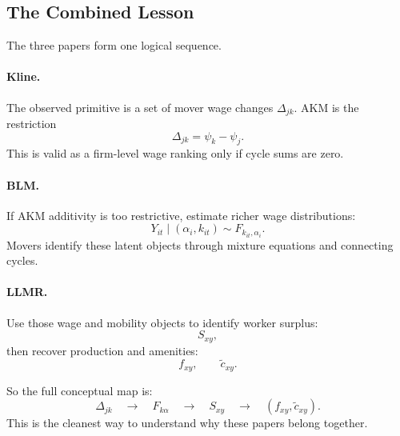 \documentclass[11pt]{article}
\newcommand{\1}{\mathbf{1}}
\begin{document}
\subsection{The Combined Lesson}

The three papers form one logical sequence.

\paragraph{Kline.}
The observed primitive is a set of mover wage changes $\Delta_{jk}$. AKM is the restriction
\[
\Delta_{jk}=\psi_k-\psi_j.
\]
This is valid as a firm-level wage ranking only if cycle sums are zero.

\paragraph{BLM.}
If AKM additivity is too restrictive, estimate richer wage distributions:
\[
Y_{it}\mid(\alpha_i,k_{it})\sim F_{k_{it},\alpha_i}.
\]
Movers identify these latent objects through mixture equations and connecting cycles.

\paragraph{LLMR.}
Use those wage and mobility objects to identify worker surplus:
\[
S_{xy},
\]
then recover production and amenities:
\[
f_{xy},\qquad \tilde c_{xy}.
\]

So the full conceptual map is:
\[
\boxed{
\Delta_{jk}
\quad\to\quad
F_{k\alpha}
\quad\to\quad
S_{xy}
\quad\to\quad
(f_{xy},\tilde c_{xy}).
}
\]
This is the cleanest way to understand why these papers belong together.
\end{document}
